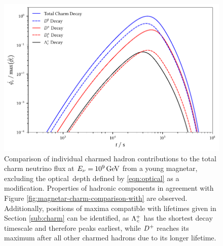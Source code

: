 \begin{figure}[H]
	\centering
	\includegraphics{../plots/build/magnetar_charm_decay_comparison_without.pdf}
	\caption[Magnetar $\nu \kern+0.5pt$ flux from $c$ decay excluding optical depth.]
			{Comparison of individual charmed hadron contributions to the total charm neutrino flux at
			 $E_\nu = \kern-0.5pt \qty{e9}{\giga\electronvolt}$ from a young magnetar, excluding the optical~depth
			 defined by \eqref{eqn:optical} as a modification. Properties of hadronic components in agreement with
			 Figure \ref{fig:magnetar-charm-comparison-with} are observed. Additionally, positions of maxima compatible
			 with lifetimes given in Section \ref{sub:charm} can be identified, as $\Lambda_{\kern+0.5pt c}^{\kern-0.5pt +}$
			 has the shortest decay timescale and therefore peaks earliest, while $D^+ \kern-0.5pt$ reaches its maximum after all other charmed
			 hadrons due to its longer lifetime.}
	\label{fig:magnetar-charm-comparison-without}
\end{figure}

